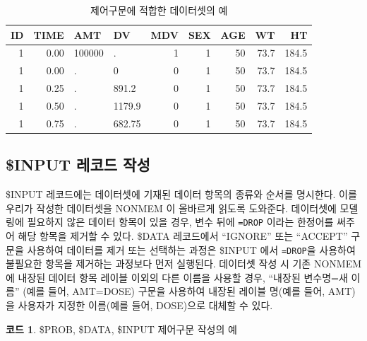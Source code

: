 \documentclass[
  11pt,
  krantz2, a4paper, twoside]{krantz}
\newenvironment{Shaded}{\begin{snugshade}}{\end{snugshade}}
\newcommand{\DataTypeTok}[1]{\textcolor[rgb]{0.13,0.29,0.53}{#1}}
\newcommand{\KeywordTok}[1]{\textcolor[rgb]{0.13,0.29,0.53}{\textbf{#1}}}
\newcommand{\NormalTok}[1]{#1}
\newcommand{\OtherTok}[1]{\textcolor[rgb]{0.56,0.35,0.01}{#1}}
\theoremstyle{definition}
\theoremstyle{definition}
\newtheorem{example}{코드}[chapter]
\theoremstyle{definition}
\theoremstyle{remark}
\begin{document}
\begin{table}

\caption{\label{tab:tab}제어구문에 적합한 데이터셋의 예}
\centering
\begin{tabular}[t]{rrllrrrrr}
\toprule
ID & TIME & AMT & DV & MDV & SEX & AGE & WT & HT\\
\midrule
1 & 0.00 & 100000 & . & 1 & 1 & 50 & 73.7 & 184.5\\
1 & 0.00 & . & 0 & 0 & 1 & 50 & 73.7 & 184.5\\
1 & 0.25 & . & 891.2 & 0 & 1 & 50 & 73.7 & 184.5\\
1 & 0.50 & . & 1179.9 & 0 & 1 & 50 & 73.7 & 184.5\\
1 & 0.75 & . & 682.75 & 0 & 1 & 50 & 73.7 & 184.5\\
\bottomrule
\end{tabular}
\end{table}

\hypertarget{input-uxb808uxcf54uxb4dc-uxc791uxc131}{%
\subsection{\$INPUT 레코드 작성}\label{input-uxb808uxcf54uxb4dc-uxc791uxc131}}


\$INPUT 레코드에는 데이터셋에 기재된 데이터 항목의 종류와 순서를 명시한다. 이를 우리가 작성한 데이터셋을 NONMEM 이 올바르게 읽도록 도와준다. 데이터셋에 모델링에 필요하지 않은 데이터 항목이 있을 경우, 변수 뒤에 \texttt{=DROP} 이라는 한정어를 써주어 해당 항목을 제거할 수 있다. \$DATA 레코드에서 ``IGNORE'' 또는 ``ACCEPT'' 구문을 사용하여 데이터를 제거 또는 선택하는 과정은 \$INPUT 에서 \texttt{=DROP}을 사용하여 불필요한 항목을 제거하는 과정보다 먼저 실행된다. 데이터셋 작성 시 기존 NONMEM에 내장된 데이터 항목 레이블 이외의 다른 이름을 사용할 경우, ``내장된 변수명=새 이름'' (예를 들어, AMT=DOSE) 구문을 사용하여 내장된 레이블 명(예를 들어, AMT)을 사용자가 지정한 이름(예를 들어, DOSE)으로 대체할 수 있다.

\begin{example}
\protect\hypertarget{exm:input}{}{\label{exm:input} }\$PROB, \$DATA, \$INPUT 제어구문 작성의 예
\end{example}
\vspace{-5ex}

\begin{Shaded}
\end{Shaded}
\end{document}
